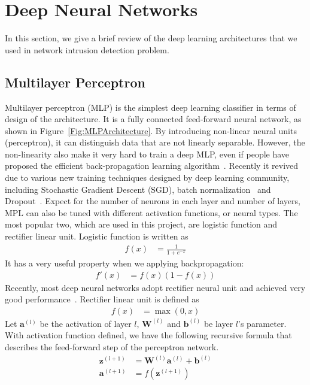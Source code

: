 \section{Deep Neural Networks}
In this section, we give a brief review of the deep learning architectures that we used
in network intrusion detection problem.

\subsection{Multilayer Perceptron}
Multilayer perceptron (MLP) is the simplest deep learning classifier in terms of
design of the architecture.
It is a fully connected feed-forward neural network, as shown in Figure~\ref{Fig:MLPArchitecture}.
By introducing non-linear neural units (perceptron), it can distinguish data that are
not linearly separable.
However, the non-linearity also make it very hard to train a deep MLP,
even if people have proposed the efficient back-propagation learning algorithm~\cite{Backpropagation}.
Recently it revived due to various new training techniques designed by deep learning community,
including Stochastic Gradient Descent (SGD),
batch normalization~\cite{BatchNorm} and Dropout~\cite{Dropout}.
Expect for the number of neurons in each layer and number of layers,
MPL can also be tuned with different activation functions, or neural types.
The most popular two, which are used in this project, are logistic function
and rectifier linear unit.
Logistic function is written as
\begin{align}
        f(x) &= \frac{1}{1 + e^{-x}}
\end{align}
It has a very useful property when we applying backpropagation:
\begin{align}
        f'(x) &= f(x) (1-f(x))
\end{align}
Recently, most deep neural networks adopt rectifier neural unit and achieved very good performance~\cite{DeepLearning}.
Rectifier linear unit is defined as
\begin{align}
        f(x) &= \max(0, x)
\end{align}
Let $\mathbf{a}^{(l)}$ be the activation of layer $l$,
$\mathbf{W}^{(l)}$ and $\mathbf{b}^{(l)}$ be layer $l$'s parameter.
With activation function defined, we have the following recursive formula that describes
the feed-forward step of the perceptron network.
\begin{align}
        \mathbf{z}^{(l+1)} &= \mathbf{W}^{(l)} \mathbf{a}^{(l)} + \mathbf{b}^{(l)} \\
        \mathbf{a}^{(l+1)} &= f(\mathbf{z}^{(l+1)})
\end{align}


